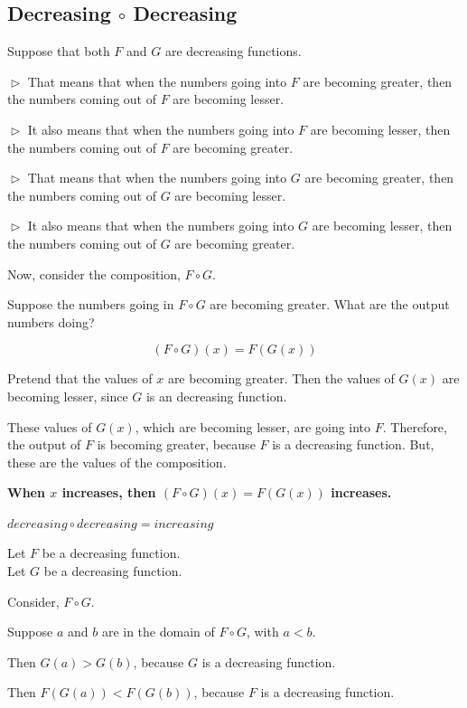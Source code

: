 \documentclass{ximera}
\begin{document}
\subsection*{Decreasing $\circ$ Decreasing}


Suppose that both $F$ and $G$ are decreasing functions. 

$\vartriangleright$ That means that when the numbers going into $F$ are becoming greater, then the numbers coming out of $F$ are becoming lesser. 


$\vartriangleright$ It also means that when the numbers going into $F$ are becoming lesser, then the numbers coming out of $F$ are becoming greater. 


$\vartriangleright$ That means that when the numbers going into $G$ are becoming greater, then the numbers coming out of $G$ are becoming lesser. 



$\vartriangleright$ It also means that when the numbers going into $G$ are becoming lesser, then the numbers coming out of $G$ are becoming greater. 


Now, consider the composition, $F \circ G$. 


Suppose the numbers going in $F \circ G$ are becoming greater.  What are the output numbers doing? 




\[ (F \circ G)(x) = F(G(x)) \]


Pretend that the values of $x$ are becoming greater. Then the values of $G(x)$ are becoming lesser, since $G$ is an decreasing function.

These values of $G(x)$, which are becoming lesser, are going into $F$.  Therefore, the output of $F$ is becoming greater, because $F$ is a decreasing function.  But, these are the values of the composition.



\begin{center}
\textbf{\textcolor{red!70!black}{When $x$ increases, then $(F \circ G)(x) = F(G(x))$ increases.}}
\end{center}






\begin{fact}
$decreasing \circ decreasing = increasing$


Let $F$ be a decreasing function. \\
Let $G$ be a decreasing function. 


Consider, $F \circ G$.

Suppose $a$ and $b$ are in the domain of $F \circ G$, with $a < b$. 

Then $G(a) > G(b)$, because $G$ is a decreasing function. 

Then $F(G(a)) < F(G(b))$, because $F$ is a decreasing function.


\end{fact}
\end{document}
